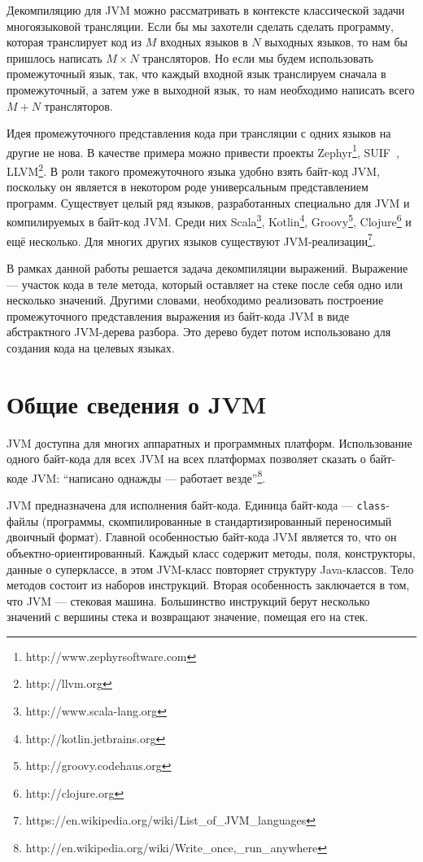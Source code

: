 Декомпиляцию для JVM можно рассматривать в контексте классической задачи многоязыковой трансляции. 
Если бы мы захотели сделать сделать программу, которая транслирует код из $M$ входных языков в $N$ выходных 
языков, то нам бы пришлось написать $M\times N$ трансляторов. Но если мы будем использовать промежуточный 
язык, так, что каждый входной язык транслируем сначала в промежуточный, а затем уже в выходной язык, то нам 
необходимо написать всего $M + N$ трансляторов. 

Идея промежуточного представления кода при трансляции с одних языков на другие не нова. В качестве 
примера можно привести проекты Zephyr\footnote{http://www.zephyrsoftware.com}, 
SUIF~\cite{book:suif}, LLVM\footnote{http://llvm.org}. В роли такого промежуточного языка удобно взять байт-код 
JVM, поскольку он является в некотором роде универсальным представлением программ. Существует целый ряд 
языков, разработанных специально для JVM и компилируемых в байт-код JVM. Среди них Scala\footnote{http://www.scala-lang.org}, 
Kotlin\footnote{http://kotlin.jetbrains.org}, Groovy\footnote{http://groovy.codehaus.org}, Clojure\footnote{http://clojure.org} 
и ещё несколько. Для многих других языков существуют JVM-реализации\footnote{https://en.wikipedia.org/wiki/List\_of\_JVM\_languages}. 

В рамках данной работы решается задача декомпиляции выражений. Выражение --- участок кода в теле метода, 
который оставляет на стеке после себя одно или несколько значений. Другими словами, необходимо реализовать 
построение промежуточного представления выражения из байт-кода JVM в виде абстрактного JVM-дерева разбора. 
Это дерево будет потом использовано для создания кода на целевых языках. 

\section{Общие сведения о JVM}

JVM доступна для многих аппаратных и программных платформ. Использование одного байт-кода для всех JVM на всех 
платформах позволяет сказать о байт-коде JVM: ``написано однажды --- работает везде''\footnote{http://en.wikipedia.org/wiki/Write\_once,\_run\_anywhere}.

JVM предназначена для исполнения байт-кода. Единица байт-кода --- \texttt{class}-файлы (программы, скомпилированные в 
стандартизированный переносимый двоичный формат). Главной особенностью байт-кода JVM является то, что он объектно-ориентированный. 
Каждый класс содержит методы, поля, конструкторы, данные о суперклассе, в этом JVM-класс повторяет структуру Java-классов. 
Тело методов состоит из наборов инструкций. Вторая особенность заключается в том, что JVM --- стековая машина. Большинство инструкций 
берут несколько значений с вершины стека и возвращают значение, помещая его на стек.

